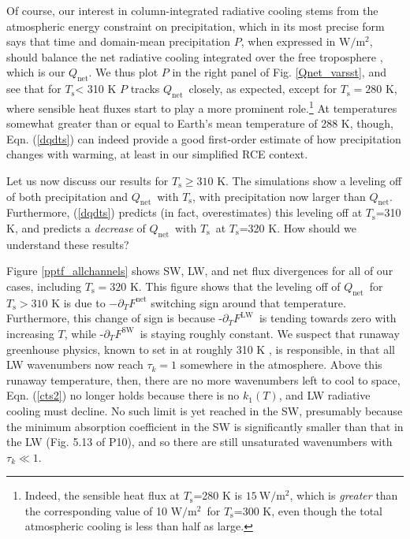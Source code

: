 \documentclass[10pt]{article}
\newcommand{\eqnref}[1]{(\ref{#1})}
\newcommand{\ppt}{\ensuremath{\partial_T}}
\newcommand{\Qnet}{\ensuremath{Q_\mathrm{net}}}
\newcommand{\FLW}{\ensuremath{F^\mathrm{LW}}}
\newcommand{\FSW}{\ensuremath{F^\mathrm{SW}}}
\newcommand{\Fnet}{\ensuremath{F^\mathrm{net}}}
\newcommand{\tauk}{\ensuremath{\tau_k}}
\newcommand{\Wmsq}{\ensuremath{\mathrm{W/m^2}}}
\newcommand{\Ts}{\ensuremath{T_\mathrm{s}}}
\begin{document}
Of course,  our interest in column-integrated radiative cooling stems from the atmospheric energy constraint on precipitation, which in its most precise form says that time and domain-mean precipitation $P$, when expressed in $\mathrm{W/m^2}$, should balance the net radiative cooling integrated over the free troposphere \citep{ogorman2012}, which is our \Qnet. We thus plot $P$ in the right panel of Fig. \ref{Qnet_varsst}, and see that for \Ts < 310 K $P$ tracks \Qnet\ closely, as expected, except for  $\Ts=280$ K, where sensible heat fluxes start to play a more prominent role.\footnote{Indeed, the sensible heat flux at \Ts=280 K  is $\mathrm{15\ W/m^2}$, which is \emph{greater} than the corresponding value of 10 \Wmsq\ for \Ts=300 K, even though the total atmospheric cooling is less than half as large.} 
 At temperatures somewhat greater than or equal to Earth's mean temperature of 288 K, though,  Eqn. \eqnref{dqdts} can indeed provide a good first-order estimate of how precipitation changes with warming, at least in our simplified RCE context. 

Let us now discuss our results for $\Ts \geq 310$ K. The simulations show a leveling off of both precipitation and \Qnet\ with \Ts, with precipitation now larger than \Qnet. Furthermore, \eqnref{dqdts} predicts (in fact, overestimates) this leveling off at \Ts=310 K, and predicts a \emph{decrease} of \Qnet\ with \Ts\ at \Ts=320 K. How should we understand these results?

Figure \ref{pptf_allchannels} shows SW, LW, and net flux divergences for all of our cases, including $\Ts=320$ K. This figure shows that the leveling off of \Qnet\ for $\Ts > 310$ K is due to $ - \ppt \Fnet$ switching sign around that temperature.  Furthermore, this change of sign is because -\ppt \FLW\ is tending towards zero with increasing $T$, while -\ppt \FSW\ is staying roughly constant. We suspect that runaway greenhouse physics, known to set in at roughly 310 K \citep{goldblatt2013}, is responsible, in that all LW wavenumbers now reach $\tauk =1$ somewhere in the atmosphere. Above this runaway temperature, then, there are no more wavenumbers left to cool to space, Eqn. \eqnref{cts2} no longer holds because there is no $k_1(T)$, and LW radiative cooling must decline. No such limit is yet reached in the SW, presumably because the minimum absorption coefficient in the SW is significantly smaller than that in the LW (Fig. 5.13 of P10), and so there are still unsaturated wavenumbers with $\tauk \ll 1 $.
\end{document}
